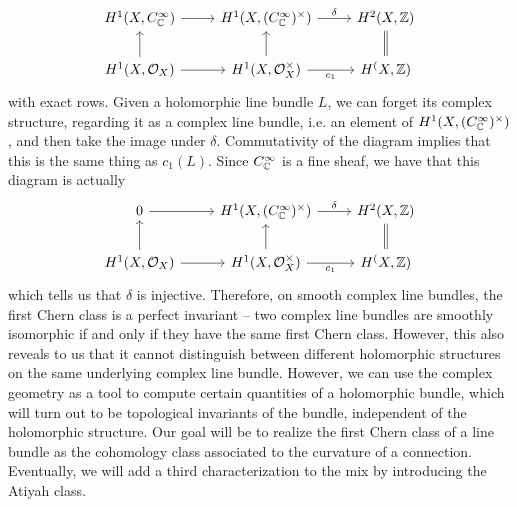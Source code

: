 \[\begin{tikzcd}
H^1(X,C^\infty_\C) \ar[r] & H^1(X, (C^\infty_\C)^\times) \ar[r, "\delta"] & H^2(X,\Z) \\
H^1(X, \O_X) \ar[r] \ar[u] & H^1(X, \O_X^\times)
\ar[u] \ar[r, "c_1"'] & H^(X, \Z) \ar[u, equal]
\end{tikzcd}\]
with exact rows. Given a holomorphic line bundle $L$, we can forget its complex
structure, regarding it as a complex line bundle, i.e. an element of
$H^1(X, (C^\infty_{\mathbb{C}})^\times)$, and then take the image under $\delta$. Commutativity
of the diagram implies that this is the same thing as $c_1(L)$. Since
$C^\infty_{\mathbb{C}}$ is a fine sheaf, we have that this diagram is actually
\[\begin{tikzcd}
0 \ar[r] & H^1(X, (C_\C^\infty)^\times) \ar[r, "\delta"] & H^2(X,\Z) \\
H^1(X, \O_X) \ar[r] \ar[u] & H^1(X, \O_X^\times)
\ar[u] \ar[r, "c_1"'] & H^(X, \Z) \ar[u, equal]
\end{tikzcd}\]
which tells us that $\delta$ is injective. Therefore, on smooth complex line bundles,
the first Chern class is a perfect invariant -- two complex line bundles are smoothly
isomorphic if and only if they have the same first Chern class. However, this also
reveals to us that it cannot distinguish between different holomorphic structures
on the same underlying complex line bundle. However, we can use the complex geometry as
a tool  to compute certain quantities of a holomorphic bundle, which will turn out to be
topological invariants of the bundle, independent of the holomorphic structure. Our goal
will be to realize the first Chern class of a line bundle as the cohomology class
associated to the curvature of a connection. Eventually, we will add a third characterization
to the mix by introducing the Atiyah class. \\


